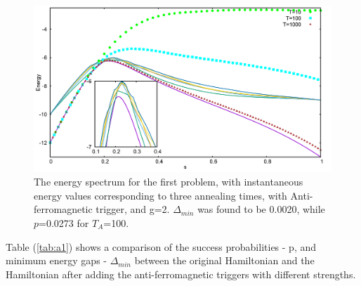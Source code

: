 \documentclass[12]{article}
\begin{document}
\begin{figure}[H]
\centering 
\includegraphics[scale=0.3]{733_s12_A_g2.png}
\caption{The energy spectrum for the first problem, with instantaneous energy values corresponding to three annealing times, with Anti-ferromagnetic trigger, and g=2. $\Delta_{min}$ was found to be 0.0020, while $p$=0.0273 for $T_A$=100. }
\label{fig:a3}
\end{figure}
Table (\ref{tab:a1}) shows a comparison of the success probabilities - p, and minimum energy gaps - $\Delta_{min}$ between the original Hamiltonian and the Hamiltonian after adding the anti-ferromagnetic triggers with different strengths.
\end{document}
